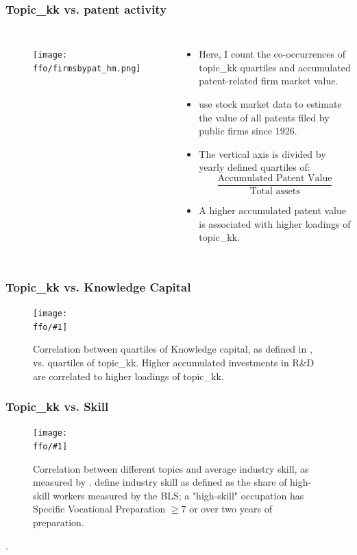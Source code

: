\documentclass{beamer}
\newcommand{\ffo}{dicfullmc10thr10defnob40noa1_4t}
\newcommand{\insertfigure}[2]{
\begin{figure}[h!]
  \centering
  \texttt{[image: \\ffo/\#1]}
  \centering
  \captionsetup{font=scriptsize}
  \caption{#2}
  \label{fig:#1}
\end{figure}
}
\begin{document}


\begin{frame}
\frametitle{Topic\_kk vs. patent activity}
       \begin{columns}
             \begin{figure}[h!]
		  \centering
		  \texttt{[image: \\ffo/firmsbypat\_hm.png]}
		  \captionsetup{font=scriptsize}
		  \label{fig:firmsbypathm}
			\end{figure}
          \scriptsize
              \begin{itemize}
              \item Here, I count the co-occurrences of topic\_kk quartiles and accumulated patent-related firm market value.
              \item \cite{Kogan2017-fx} use stock market data to estimate the value of all patents filed by public firms since 1926.
			  \item The vertical axis is divided by yearly defined quartiles of:
			  \begin{equation}
  				\frac{\text{Accumulated Patent Value}}{\text{Total assets}}
				\end{equation}
			  \item A higher accumulated patent value is associated with higher loadings of topic\_kk.
			\end{itemize}
	  \end{columns} 
\end{frame}

\begin{frame}
\frametitle{Topic\_kk vs. Knowledge Capital}
\scriptsize
\insertfigure{topicvskkpt_hm}{Correlation between quartiles of Knowledge capital,  as defined in \cite{Peters2017-fl}, vs. quartiles of topic\_kk. Higher accumulated investments in R\&D are correlated to higher loadings of topic\_kk.}
\end{frame}

\begin{frame}
\frametitle{Topic\_kk vs. Skill}
\scriptsize
\insertfigure{heatmap}{Correlation between different topics and average industry skill, as measured by \cite{Belo2017-qi}. \cite{Belo2017-qi} define industry skill as defined as the share of high-skill workers measured by the BLS; a "high-skill" occupation has Specific Vocational Preparation $\geq 7$ or over two years of preparation.}. 
\end{frame}
\end{document}

